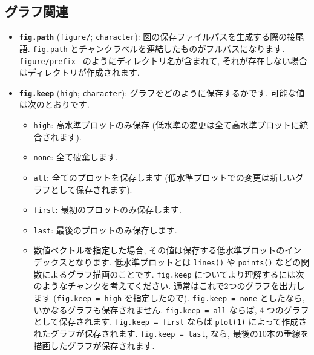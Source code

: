 \documentclass[
  lualatex,ja=standard,jafont=noto-otf]{bxjsreport}
\providecommand{\tightlist}{%
  \setlength{\itemsep}{0pt}\setlength{\parskip}{0pt}}
\begin{document}
\hypertarget{plots}{%
\subsection{グラフ関連}\label{plots}}

\begin{itemize}
\tightlist
\item
  \textbf{\texttt{fig.path}}
  (\texttt{\textquotesingle{}figure/\textquotesingle{}};
  \texttt{character}): 図の保存ファイルパスを生成する際の接尾語.
  \texttt{fig.path} とチャンクラベルを連結したものがフルパスになります.
  \texttt{figure/prefix-} のようにディレクトリ名が含まれて,
  それが存在しない場合はディレクトリが作成されます.
\item
  \textbf{\texttt{fig.keep}}
  (\texttt{\textquotesingle{}high\textquotesingle{}};
  \texttt{character}): グラフをどのように保存するかです.
  可能な値は次のとおりです.

  \begin{itemize}
  \tightlist
  \item
    \texttt{high}: 高水準プロットのみ保存
    (低水準の変更は全て高水準プロットに統合されます).
  \item
    \texttt{none}: 全て破棄します.
  \item
    \texttt{all}: 全てのプロットを保存します
    (低水準プロットでの変更は新しいグラフとして保存されます).
  \item
    \texttt{first}: 最初のプロットのみ保存します.
  \item
    \texttt{last}: 最後のプロットのみ保存します.
  \item
    数値ベクトルを指定した場合,
    その値は保存する低水準プロットのインデックスとなります.
    低水準プロットとは \texttt{lines()} や \texttt{points()}
    などの関数によるグラフ描画のことです. \texttt{fig.keep}
    についてより理解するには次のようなチャンクを考えてください.
    通常はこれで2つのグラフを出力します
    (\texttt{fig.keep\ =\ \textquotesingle{}high\textquotesingle{}}
    を指定したので).
    \texttt{fig.keep\ =\ \textquotesingle{}none\textquotesingle{}}
    としたなら, いかなるグラフも保存されません.
    \texttt{fig.keep\ =\ \textquotesingle{}all\textquotesingle{}}
    ならば, 4 つのグラフとして保存されます.
    \texttt{fig.keep\ =\ \textquotesingle{}first\textquotesingle{}}
    ならば \texttt{plot(1)} によって作成されたグラフが保存されます.
    \texttt{fig.keep\ =\ \textquotesingle{}last\textquotesingle{}},
    なら, 最後の10本の垂線を描画したグラフが保存されます.
  \end{itemize}


\end{itemize}
\end{document}
